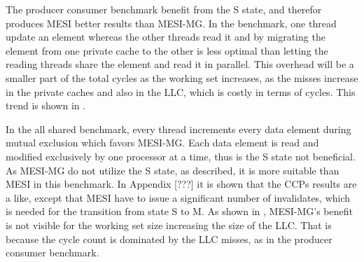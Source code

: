 The producer consumer benchmark benefit from the S state, and therefor produces MESI better results than MESI-MG. In the benchmark, one thread update an element whereas the other threads read it and by migrating the element from one private cache to the other is less optimal than letting the reading threads share the element and read it in parallel. This overhead will be a smaller part of the total cycles as the working set increases, as the misses increase in the private caches and also in the LLC, which is costly in terms of cycles. This trend is shown in . 

In the all shared benchmark, every thread increments every data element during mutual exclusion which favors MESI-MG. Each data element is read and modified exclusively by one processor at a time, thus is the S state not beneficial. As MESI-MG do not utilize the S state, as described, it is more suitable than MESI in this benchmark. In Appendix [???] it is shown that the CCPs results are a like, except that MESI have to issue a significant number of invalidates, which is needed for the transition from state S to M. As shown in , MESI-MG's benefit is not visible for the working set size increasing the size of the LLC. That is because the cycle count is dominated by the LLC misses, as in the producer consumer benchmark.